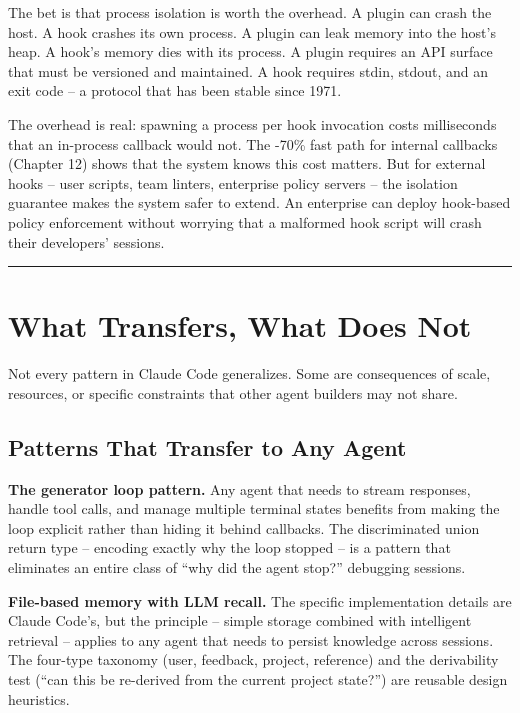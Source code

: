 \documentclass[
  english,
  11pt,
  letterpaper,
]{book}
\begin{document}
The bet is that process isolation is worth the overhead. A plugin can
crash the host. A hook crashes its own process. A plugin can leak memory
into the host's heap. A hook's memory dies with its process. A plugin
requires an API surface that must be versioned and maintained. A hook
requires stdin, stdout, and an exit code -- a protocol that has been
stable since 1971.

The overhead is real: spawning a process per hook invocation costs
milliseconds that an in-process callback would not. The -70\% fast path
for internal callbacks (Chapter 12) shows that the system knows this
cost matters. But for external hooks -- user scripts, team linters,
enterprise policy servers -- the isolation guarantee makes the system
safer to extend. An enterprise can deploy hook-based policy enforcement
without worrying that a malformed hook script will crash their
developers' sessions.

\begin{center}\rule{0.5\linewidth}{0.5pt}\end{center}

\section{What Transfers, What Does
Not}\label{what-transfers-what-does-not}

Not every pattern in Claude Code generalizes. Some are consequences of
scale, resources, or specific constraints that other agent builders may
not share.

\subsection{Patterns That Transfer to Any
Agent}\label{patterns-that-transfer-to-any-agent}

\textbf{The generator loop pattern.} Any agent that needs to stream
responses, handle tool calls, and manage multiple terminal states
benefits from making the loop explicit rather than hiding it behind
callbacks. The discriminated union return type -- encoding exactly why
the loop stopped -- is a pattern that eliminates an entire class of
``why did the agent stop?'' debugging sessions.

\textbf{File-based memory with LLM recall.} The specific implementation
details are Claude Code's, but the principle -- simple storage combined
with intelligent retrieval -- applies to any agent that needs to persist
knowledge across sessions. The four-type taxonomy (user, feedback,
project, reference) and the derivability test (``can this be re-derived
from the current project state?'') are reusable design heuristics.
\end{document}

